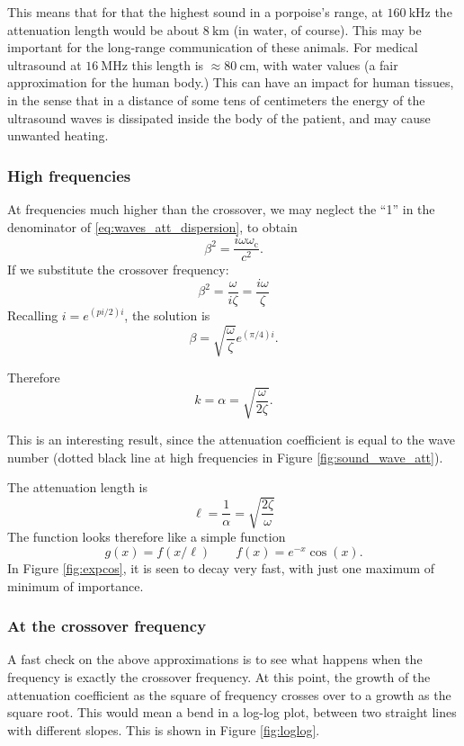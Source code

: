 This means that for that the highest sound in a porpoise's range, at
$\SI{160}{\kilo\hertz}$ the attenuation length would be about
$\SI{8}{\kilo\meter}$ (in water, of course). This may be important for
the long-range communication of these animals. For medical ultrasound
at $\SI{16}{\mega\hertz}$ this length is
$\approx\SI{80}{\centi\meter}$, with water values (a fair
approximation for the human body.) This can have an impact for human
tissues, in the sense that in a distance of some tens of centimeters
the energy of the ultrasound waves is dissipated inside the body of
the patient, and may cause unwanted heating.

\subsubsection{High frequencies}

At frequencies much higher than the crossover, we may neglect the
``1'' in the denominator of \ref{eq:waves_att_dispersion}, to obtain
\[
\beta^2 = \frac{i \omega\omega_\mathrm{c}}{c^2} .
\]
If we substitute the crossover frequency:
\[
\beta^2 = \frac{\omega}{i \zeta} =\frac{i \omega}{\zeta} 
\]
Recalling $i = e^{(pi/2)i} $, the solution is
\[
\beta =\sqrt{ \frac{\omega}{ \zeta }} e^{(\pi/4)i}.
\]

Therefore
\[
k=\alpha =\sqrt{\frac{\omega}{ 2 \zeta}}.
\]

This is an interesting result, since the attenuation coefficient is
equal to the wave number (dotted black line at high frequencies in
Figure \ref{fig:sound_wave_att}).

The attenuation length is
\[
\ell= \frac{1}{\alpha}=\sqrt{\frac{ 2 \zeta}{\omega}}
\]
The function looks therefore like a simple function
\[
g(x)= f(x/\ell) \qquad  f(x) = e^{-x}\cos(x) .
\]
In Figure \ref{fig:expcos}, it is seen to decay very fast, with just
one maximum of minimum of importance.



\subsubsection{At the crossover frequency}


A fast check on the above approximations is to see what happens when
the frequency is exactly the crossover frequency. At this point, the
growth of the attenuation coefficient as the square of frequency
crosses over to a growth as the square root. This would mean a bend in
a log-log plot, between two straight lines with different slopes. This
is shown in Figure \ref{fig:loglog}.

